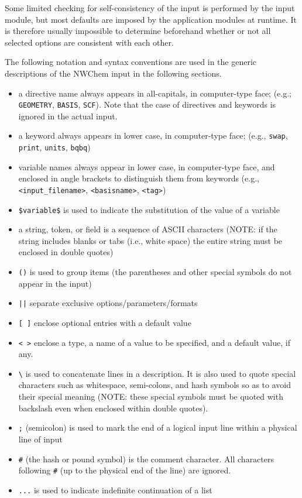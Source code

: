 Some limited checking for self-consistency of the input is performed
by the input module, but most defaults are imposed by the application
modules at runtime.  It is therefore usually impossible to determine
beforehand whether or not all selected options are consistent with each
other.

The following notation and syntax conventions are used in the generic 
descriptions of the NWChem input in the following sections.

\sloppy

\begin{itemize}
\item a directive name always appears in all-capitals, in computer-type 
face; (e.g.; \verb+GEOMETRY+, \verb+BASIS+, \verb+SCF+).  Note that 
the case of directives and keywords is ignored in the actual input.
\item a keyword always appears in lower case, in computer-type face; (e.g.,
{\tt swap}, {\tt print}, {\tt units}, {\tt bqbq})
\item variable names always appear in lower case, in computer-type face, 
and enclosed in angle brackets to distinguish them from keywords (e.g.,
{\tt <input\_filename>}, {\tt <basisname>}, {\tt <tag>})
\item \verb+$variable$+ is used to indicate the substitution of the value of a
      variable
\item a string, token, or field is a sequence of ASCII characters (NOTE: if 
the string includes blanks or tabs (i.e., white space) the entire string must
be enclosed in double quotes)
\item \verb+()+ is used to group items (the parentheses and other
      special symbols do not appear in the input)
\item \verb+||+ separate exclusive options/parameters/formats
\item \verb+[ ]+ enclose optional entries with a default value
\item \verb+< >+ enclose a type, a name of a value to be specified,
      and a default value, if any.

\item \verb+\+ is used to concatenate lines in a description.  It is
also used to quote special characters such as whitespace, semi-colons,
and hash symbols so as to avoid their special meaning (NOTE: these
special symbols must be quoted with backslash even when enclosed
within double quotes).

\item \verb+;+ (semicolon) is used to mark the end of a logical input 
line within a physical line of input
\item \verb+#+ (the hash or pound symbol) is the comment character.  All
characters following \verb+#+ (up to the physical end of the line) are ignored.

\item \verb+...+ is used to indicate indefinite continuation of a list
\end{itemize}

